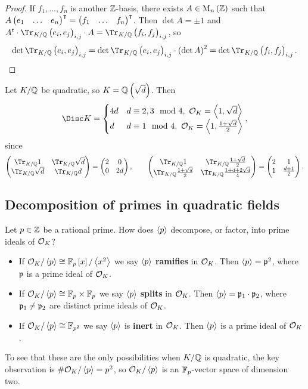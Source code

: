 \begin{proof}
If $ f_1, \dots, f_n $ is another $ \mathbb{Z} $-basis, there exists $ A \in \M_n\br{\ZZ} $ such that $ A\onebythree{e_1}{\dots}{e_n}^\intercal = \onebythree{f_1}{\dots}{f_n}^\intercal $. Then $ \det A = \pm 1 $ and $ A^t \cdot \Tr_{K / \QQ}\br{e_i, e_j}_{i, j} \cdot A = \Tr_{K / \QQ}\br{f_i, f_j}_{i, j} $, so
$$ \det \Tr_{K / \QQ}\br{e_i, e_j}_{i, j} = \det \Tr_{K / \QQ}\br{e_i, e_j}_{i, j} \cdot \br{\det A}^2 = \det \Tr_{K / \QQ}\br{f_i, f_j}_{i, j}. $$
\end{proof}

\begin{example*}
Let $ K / \mathbb{Q} $ be quadratic, so $ K = \QQ\br{\sqrt{d}} $. Then
$$ \Disc K =
\begin{cases}
4d & d \equiv 2, 3 \mod 4, \ \OOO_K = \abr{1, \sqrt{d}} \\
d & d \equiv 1 \mod 4, \ \OOO_K = \abr{1, \tfrac{1 + \sqrt{d}}{2}}
\end{cases},
$$
since
$$ \twobytwo{\Tr_{K / \QQ} 1}{\Tr_{K / \QQ} \sqrt{d}}{\Tr_{K / \QQ} \sqrt{d}}{\Tr_{K / \QQ} d} = \twobytwo{2}{0}{0}{2d}, \qquad \twobytwo{\Tr_{K / \QQ} 1}{\Tr_{K / \QQ} \tfrac{1 + \sqrt{d}}{2}}{\Tr_{K / \QQ} \tfrac{1 + \sqrt{d}}{2}}{\Tr_{K / \QQ} \tfrac{1 + d + 2\sqrt{d}}{4}} = \twobytwo{2}{1}{1}{\tfrac{d + 1}{2}}. $$
\end{example*}

\subsection{Decomposition of primes in quadratic fields}

Let $ p \in \mathbb{Z} $ be a rational prime. How does $ \left\langle p \right\rangle $ decompose, or factor, into prime ideals of $ \mathcal{O}_K $?
\begin{itemize}
\item If $ \OOO_K / \abr{p} \cong \FF_p\sbr{x} / \abr{x^2} $ we say $ \left\langle p \right\rangle $ \textbf{ramifies} in $ \mathcal{O}_K $. Then $ \left\langle p \right\rangle = \mathfrak{p}^2 $, where $ \mathfrak{p} $ is a prime ideal of $ \mathcal{O}_K $.
\item If $ \mathcal{O}_K / \left\langle p \right\rangle \cong \mathbb{F}_p \times \mathbb{F}_p $ we say $ \left\langle p \right\rangle $ \textbf{splits} in $ \mathcal{O}_K $. Then $ \left\langle p \right\rangle = \mathfrak{p}_1 \cdot \mathfrak{p}_2 $, where $ \mathfrak{p}_1 \ne \mathfrak{p}_2 $ are distinct prime ideals of $ \mathcal{O}_K $.
\item If $ \mathcal{O}_K / \left\langle p \right\rangle \cong \mathbb{F}_{p^2} $ we say $ \left\langle p \right\rangle $ is \textbf{inert} in $ \mathcal{O}_K $. Then $ \left\langle p \right\rangle $ is a prime ideal of $ \mathcal{O}_K $.
\end{itemize}
To see that these are the only possibilities when $ K / \mathbb{Q} $ is quadratic, the key observation is $ \#\mathcal{O}_K / \left\langle p \right\rangle = p^2 $, so $ \mathcal{O}_K / \left\langle p \right\rangle $ is an $ \mathbb{F}_p $-vector space of dimension two.

